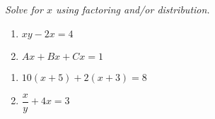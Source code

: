 \documentclass[11pt]{article}
\newcommand{\ds}{\displaystyle}
\begin{document}
\noindent 
\textit{Solve for $x$ using factoring and/or distribution.}
\begin{multicols}{2}
\begin{enumerate}
\setcounter{enumi}{\theenumCount}
\item $xy - 2x = 4$ 
\item $Ax + Bx + Cx = 1$ 
\setcounter{enumCount}{\theenumi}
\end{enumerate}
\end{multicols}
\vfill

\begin{multicols}{2}
\begin{enumerate}
\setcounter{enumi}{\theenumCount}
\item $10(x+5)+2(x+3) = 8$
\item $\dfrac{x}{y} + 4x = 3$ 
\setcounter{enumCount}{\theenumi}
\end{enumerate}
\end{multicols}
\vfill

%
%
%
%
\end{document}
